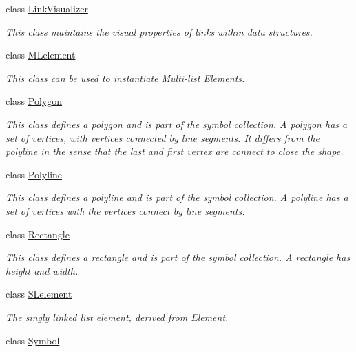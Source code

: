 \begin{DoxyCompactItemize}
class \hyperlink{classbridges_1_1datastructure_1_1_link_visualizer}{Link\+Visualizer}
\begin{DoxyCompactList}\small\item\em This class maintains the visual properties of links within data structures. \end{DoxyCompactList}\item 
class \hyperlink{classbridges_1_1datastructure_1_1_m_lelement}{M\+Lelement}
\begin{DoxyCompactList}\small\item\em This class can be used to instantiate Multi-\/list Elements. \end{DoxyCompactList}\item 
class \hyperlink{classbridges_1_1datastructure_1_1_polygon}{Polygon}
\begin{DoxyCompactList}\small\item\em This class defines a polygon and is part of the symbol collection. A polygon has a set of vertices, with vertices connected by line segments. It differs from the polyline in the sense that the last and first vertex are connect to close the shape. \end{DoxyCompactList}\item 
class \hyperlink{classbridges_1_1datastructure_1_1_polyline}{Polyline}
\begin{DoxyCompactList}\small\item\em This class defines a polyline and is part of the symbol collection. A polyline has a set of vertices with the vertices connect by line segments. \end{DoxyCompactList}\item 
class \hyperlink{classbridges_1_1datastructure_1_1_rectangle}{Rectangle}
\begin{DoxyCompactList}\small\item\em This class defines a rectangle and is part of the symbol collection. A rectangle has height and width. \end{DoxyCompactList}\item 
class \hyperlink{classbridges_1_1datastructure_1_1_s_lelement}{S\+Lelement}
\begin{DoxyCompactList}\small\item\em The singly linked list element, derived from \hyperlink{classbridges_1_1datastructure_1_1_element}{Element}. \end{DoxyCompactList}\item 
class \hyperlink{classbridges_1_1datastructure_1_1_symbol}{Symbol}

\end{DoxyCompactItemize}
